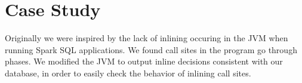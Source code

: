 \section{Case Study}
\label{sec:case-study}

Originally we were inspired by the lack of inlining occuring in the JVM when
running Spark SQL applications.
We found call sites in the program go through phases.
We modified the JVM to output inline decisions consistent with our database,
in order to easily check the behavior of inlining call sites.
